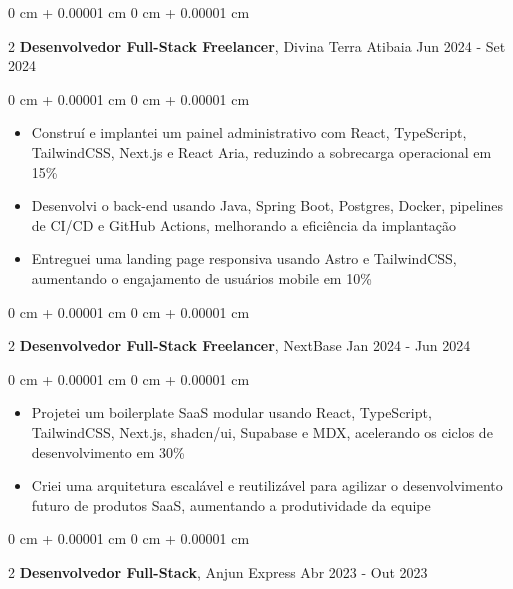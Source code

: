 \documentclass[10pt, letterpaper]{article}
\newenvironment{highlights}{ \begin{itemize}[ topsep=0.10 cm, parsep=0.10 cm, partopsep=0pt,
itemsep=0pt, leftmargin=0 cm + 10pt ] }{ \end{itemize} } %
\newenvironment{onecolentry}{ \begin{adjustwidth}{ 0 cm + 0.00001 cm }{ 0 cm + 0.00001 cm }
}{ \end{adjustwidth} } %
\newenvironment{twocolentry}[2][]{ \onecolentry \def\secondColumn{#2} \setcolumnwidth{\fill, 4.5 cm}
\begin{paracol}{2} }{ \switchcolumn \raggedleft \secondColumn \end{paracol}
\endonecolentry } %
\begin{document}
	\vspace{0.2 cm}
	
	\begin{twocolentry}
		{ Jun 2024 - Set 2024 } \textbf{Desenvolvedor Full-Stack Freelancer}, Divina Terra Atibaia
	\end{twocolentry}
	
	\vspace{0.10 cm}
	\begin{onecolentry}
		\begin{highlights}
			\item Construí e implantei um painel administrativo com React, TypeScript, TailwindCSS, Next.js e React Aria, reduzindo a sobrecarga operacional em 15\%
			\item Desenvolvi o back-end usando Java, Spring Boot, Postgres, Docker, pipelines de CI/CD e GitHub Actions, melhorando a eficiência da implantação
			\item Entreguei uma landing page responsiva usando Astro e TailwindCSS, aumentando o engajamento de usuários mobile em 10\%
		\end{highlights}
	\end{onecolentry}
	
	\vspace{0.2 cm}
	
	\begin{twocolentry}
		{ Jan 2024 - Jun 2024 } \textbf{Desenvolvedor Full-Stack Freelancer}, NextBase
	\end{twocolentry}
	
	\vspace{0.10 cm}
	\begin{onecolentry}
		\begin{highlights}
			\item Projetei um boilerplate SaaS modular usando React, TypeScript, TailwindCSS, Next.js, shadcn/ui, Supabase e MDX, acelerando os ciclos de desenvolvimento em 30\%
			\item Criei uma arquitetura escalável e reutilizável para agilizar o desenvolvimento futuro de produtos SaaS, aumentando a produtividade da equipe
		\end{highlights}
	\end{onecolentry}
	
	\vspace{0.2 cm}
	
	\begin{twocolentry}
		{ Abr 2023 - Out 2023 } \textbf{Desenvolvedor Full-Stack}, Anjun Express
	\end{twocolentry}
	
\end{document}
